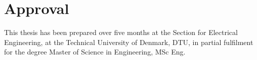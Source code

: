 \section*{Approval}
This thesis has been prepared over five months at the Section for Electrical Engineering, at the Technical University of Denmark, DTU, in partial fulfilment for the degree Master of Science in Engineering, MSc Eng. 


\vfill

\begin{center}
\namesigdate{\thesisauthor~-~\studentnumber}
\end{center}

\vfill

